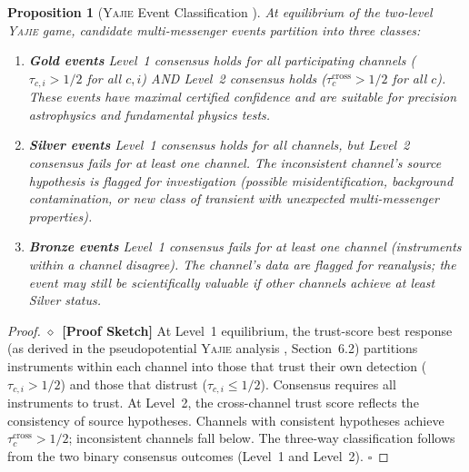 \documentclass[11pt,a4paper]{article}
\newtheorem{proposition}[theorem]{Proposition}
\theoremstyle{definition}
\newcommand{\rigorSketch}[0]{$\diamond$~\textbf{[Proof Sketch]}}
\newcommand{\Yajie}{\textsc{Yajie}}
\begin{document}
\begin{proposition}[\Yajie{} Event Classification ]\label{prop:yajie_classification}
At equilibrium of the two-level \Yajie{} game, candidate multi-messenger events partition into three classes:
\begin{enumerate}[label=(\roman*)]
    \item \textbf{Gold events} Level~1 consensus holds for all participating channels ($\tau_{c,i} > 1/2$ for all $c,i$) AND Level~2 consensus holds ($\tau_c^{\mathrm{cross}} > 1/2$ for all $c$). These events have maximal certified confidence and are suitable for precision astrophysics and fundamental physics tests.
    \item \textbf{Silver events} Level~1 consensus holds for all channels, but Level~2 consensus fails for at least one channel. The inconsistent channel's source hypothesis is flagged for investigation (possible misidentification, background contamination, or new class of transient with unexpected multi-messenger properties).
    \item \textbf{Bronze events} Level~1 consensus fails for at least one channel (instruments within a channel disagree). The channel's data are flagged for reanalysis; the event may still be scientifically valuable if other channels achieve at least Silver status.
\end{enumerate}
\end{proposition}
\begin{proof}\rigorSketch
At Level~1 equilibrium, the trust-score best response (as derived in the pseudopotential \Yajie{} analysis \cite{SCX2025}, Section~6.2) partitions instruments within each channel into those that trust their own detection ($\tau_{c,i} > 1/2$) and those that distrust ($\tau_{c,i} \leq 1/2$). Consensus requires all instruments to trust.
At Level~2, the cross-channel trust score reflects the consistency of source hypotheses. Channels with consistent hypotheses achieve $\tau_c^{\mathrm{cross}} > 1/2$; inconsistent channels fall below. The three-way classification follows from the two binary consensus outcomes (Level~1 and Level~2). $\square$
\end{proof}
\end{document}
